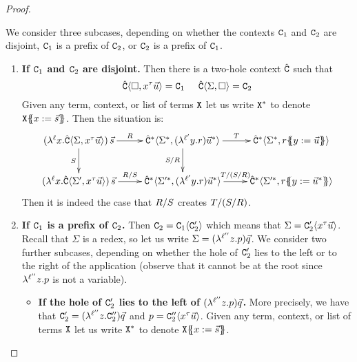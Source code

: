 \begin{proof}
\begin{enumerate}
\begin{enumerate}
    We consider three subcases, depending on whether the contexts
    $\mathtt{C}_1$ and $\mathtt{C}_2$ are disjoint,
    $\mathtt{C}_1$ is a prefix of $\mathtt{C}_2$,
    or $\mathtt{C}_2$ is a prefix of $\mathtt{C}_1$.
    \begin{enumerate}
    \item {\bf If $\mathtt{C}_1$ and $\mathtt{C}_2$ are disjoint.}
      Then there is a two-hole context $\hat{\mathtt{C}}$ such that
      \[
        \hat{\mathtt{C}}\langle\Box,x^{\tau}\vec{u}\rangle = \mathtt{C}_1
        \hspace{.5cm}
        \hat{\mathtt{C}}\langle\Sigma,\Box\rangle = \mathtt{C}_2
      \]
      Given any term, context, or list of terms $\mathtt{X}$ let us write $\mathtt{X}^*$ to denote $\mathtt{X}\{\!\!\{x := \vec{s}\}\!\!\}$.
      Then the situation is:
      \[
        \xymatrix{
          (\lamp{\lab}{\var}{\conhat\of{\Sigma,\var^{\typ}\ls{\tmthree}}})\,\ls{\tmtwo}
          \ar[r]^-{\redex}
          \ar[d]_-{\redextwo}
        &
          \conhat^*\of{\Sigma^*,(\lamp{\labtwo}{\vartwo}{\tmfour})\ls{\tmthree}^*}
          \ar[d]_-{\redextwo/\redex}
          \ar[r]^-{\redexthree}
        &
          \conhat^*\of{\Sigma^*,\tmfour\sub{\vartwo}{\ls{\tmthree}}}
        \\
          (\lamp{\lab}{\var}{\conhat\of{\Sigma',\var^{\typ}\ls{\tmthree}}})\,\ls{\tmtwo}
          \ar[r]^-{\redex/\redextwo}
        &
          \conhat^*\of{\Sigma'^*,(\lamp{\labtwo}{\vartwo}{\tmfour})\ls{\tmthree}^*}
          \ar[r]^-{\redexthree/(\redextwo/\redex)}
        &
          \conhat^*\of{\Sigma'^*,\tmfour\sub{\vartwo}{\ls{\tmthree}^*}}
        }
      \]
      Then it is indeed the case that $R/S$ creates $T/(S/R)$.
    \item {\bf If $\mathtt{C}_1$ is a prefix of $\mathtt{C}_2$.}
      Then $\mathtt{C}_2 = \mathtt{C}_1\langle\mathtt{C}'_2\rangle$ which means that $\Sigma = \mathtt{C}'_2\langle x^{\tau}\vec{u}\rangle$.
      Recall that $\Sigma$ is a redex, so let us write
      $\Sigma = (\lambda^{\ell''} z. p)\vec{q}$.
      We consider two further subcases, depending on whether the hole of $\mathtt{C}'_2$
      lies to the left or to the right of the application (observe that it cannot be at the root
      since $\lambda^{\ell''} z. p$ is not a variable).
      \begin{itemize}
      \item {\bf If the hole of $\mathtt{C}'_2$ lies to the left of $(\lambda^{\ell''} z. p)\vec{q}$.}
        More precisely, we have that
        $\mathtt{C}'_2 = (\lambda^{\ell''} z. \mathtt{C}''_2)\vec{q}$ and $p = \mathtt{C}''_2\langle x^{\tau}\vec{u}\rangle$.
        Given any term, context, or list of terms $\mathtt{X}$ let us write $\mathtt{X}^*$ to denote $\mathtt{X}\{\!\!\{x := \vec{s}\}\!\!\}$.

\end{itemize}
\end{enumerate}
\end{enumerate}
\end{enumerate}
\end{proof}
